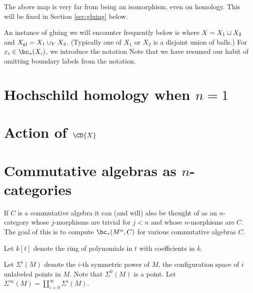 \documentclass[11pt,leqno]{amsart}
\begin{document}
The above map is very far from being an isomorphism, even on homology.
This will be fixed in Section \ref{sec:gluing} below.


An instance of gluing we will encounter frequently below is where $X = X_1 \sqcup X_2$
and $X_\mathrm{gl} = X_1 \cup_Y X_2$.
(Typically one of $X_1$ or $X_2$ is a disjoint union of balls.)
For $x_i \in \bc_*(X_i)$, we introduce the notation
Note that we have resumed our habit of omitting boundary labels from the notation.





\section{Hochschild homology when $n=1$}
\label{sec:hochschild}





\section{Action of $\CD{X}$}
\label{sec:evaluation}












\section{Commutative algebras as $n$-categories}


If $C$ is a commutative algebra it
can (and will) also be thought of as an $n$-category whose $j$-morphisms are trivial for
$j<n$ and whose $n$-morphisms are $C$. 
The goal of this  is to compute
$\bc_*(M^n, C)$ for various commutative algebras $C$.

Let $k[t]$ denote the ring of polynomials in $t$ with coefficients in $k$.

Let $\Sigma^i(M)$ denote the $i$-th symmetric power of $M$, the configuration space of $i$
unlabeled points in $M$.
Note that $\Sigma^0(M)$ is a point.
Let $\Sigma^\infty(M) = \coprod_{i=0}^\infty \Sigma^i(M)$.
\end{document}
